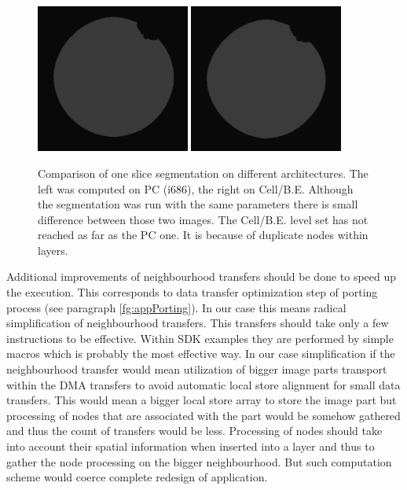 \begin{figure}
    \centering
    \includegraphics[width=0.45\textwidth]{data/png/pcSlice}
    \includegraphics[width=0.45\textwidth]{data/png/cellSlice}
    \caption[Comparison of one slice segmented on different architectures]{Comparison of one slice segmentation on different architectures.
The left was computed on PC (i686), the right on Cell/B.E.
Although the segmentation was run with the same parameters there is small difference between those two images.
The Cell/B.E. level set has not reached as far as the PC one.
It is because of duplicate nodes within layers.
}
    \label{fg:sliceComparison}
\end{figure}

\par
Additional improvements of neighbourhood transfers should be done to speed up the execution.
This corresponds to data transfer optimization step of porting process (see paragraph \ref{fg:appPorting}).
In our case this means radical simplification of neighbourhood transfers.
This transfers should take only a few instructions to be effective.
Within SDK examples they are performed by simple macros which is probably the most effective way.
In our case simplification if the neighbourhood transfer would mean utilization of bigger image parts transport within the DMA transfers to avoid automatic local store alignment for small data transfers.
This would mean a bigger local store array to store the image part but processing of nodes that are associated with the part would be somehow gathered and thus the count of transfers would be less.
Processing of nodes should take into account their spatial information when inserted into a layer and thus to gather the node processing on the bigger neighbourhood.
But such computation scheme would coerce complete redesign of application.

